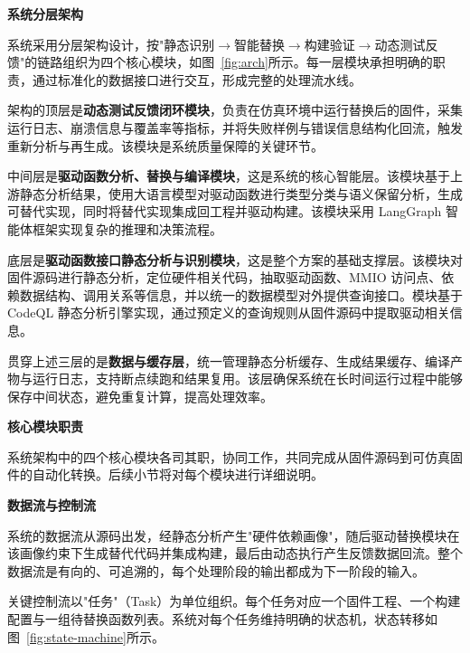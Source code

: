 \textbf{系统分层架构}

系统采用分层架构设计，按"静态识别$\to$智能替换$\to$构建验证$\to$动态测试反馈"的链路组织为四个核心模块，如图~\ref{fig:arch}所示。每一层模块承担明确的职责，通过标准化的数据接口进行交互，形成完整的处理流水线。

\noindent
架构的顶层是\textbf{动态测试反馈闭环模块}，负责在仿真环境中运行替换后的固件，采集运行日志、崩溃信息与覆盖率等指标，并将失败样例与错误信息结构化回流，触发重新分析与再生成。该模块是系统质量保障的关键环节。

中间层是\textbf{驱动函数分析、替换与编译模块}，这是系统的核心智能层。该模块基于上游静态分析结果，使用大语言模型对驱动函数进行类型分类与语义保留分析，生成可替代实现，同时将替代实现集成回工程并驱动构建。该模块采用 LangGraph 智能体框架实现复杂的推理和决策流程。

底层是\textbf{驱动函数接口静态分析与识别模块}，这是整个方案的基础支撑层。该模块对固件源码进行静态分析，定位硬件相关代码，抽取驱动函数、MMIO 访问点、依赖数据结构、调用关系等信息，并以统一的数据模型对外提供查询接口。模块基于 CodeQL 静态分析引擎实现，通过预定义的查询规则从固件源码中提取驱动相关信息。

贯穿上述三层的是\textbf{数据与缓存层}，统一管理静态分析缓存、生成结果缓存、编译产物与运行日志，支持断点续跑和结果复用。该层确保系统在长时间运行过程中能够保存中间状态，避免重复计算，提高处理效率。

\textbf{核心模块职责}

系统架构中的四个核心模块各司其职，协同工作，共同完成从固件源码到可仿真固件的自动化转换。后续小节将对每个模块进行详细说明。

\textbf{数据流与控制流}

系统的数据流从源码出发，经静态分析产生"硬件依赖画像"，随后驱动替换模块在该画像约束下生成替代代码并集成构建，最后由动态执行产生反馈数据回流。整个数据流是有向的、可追溯的，每个处理阶段的输出都成为下一阶段的输入。

关键控制流以"任务"（Task）为单位组织。每个任务对应一个固件工程、一个构建配置与一组待替换函数列表。系统对每个任务维持明确的状态机，状态转移如图~\ref{fig:state-machine}所示。

